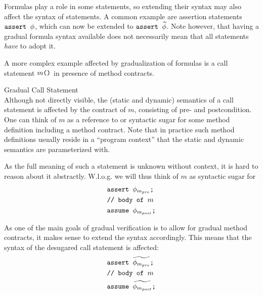 Formulas play a role in some statements, so extending their syntax may also affect the syntax of statements.
A common example are assertion statements $\textup{\texttt{assert $\phi$}}$, which can now be extended to $\textup{\texttt{assert $\widetilde{\phi}$}}$.
Note however, that having a gradual formula syntax available does not necessarily mean that all statements \emph{have} to adopt it.

A more complex example affected by gradualization of formulas is a call statement $\textup{\texttt{$m$()}}$ in presence of method contracts.
\begin{example}{Gradual Call Statement}~\\
    Although not directly visible, the (static and dynamic) semantics of a call statement is affected by the contract of $m$, consisting of pre- and postcondition.
    One can think of $m$ as a reference to or syntactic sugar for some method definition including a method contract.
    Note that in practice such method definitions usually reside in a “program context” that the static and dynamic semantics are parameterized with.
    
    As the full meaning of such a statement is unknown without context, it is hard to reason about it abstractly.
    W.l.o.g. we will thus think of $m$ as syntactic sugar for 
    \begin{align*}
    &\textup{\texttt{assert $\phi_{m_{pre}}$;}}\\
    &\textup{\texttt{// body of $m$}}\\
    &\textup{\texttt{assume $\phi_{m_{post}}$;}}
    \end{align*}
    
    As one of the main goals of gradual verification is to allow for gradual method contracts, it makes sense to extend the syntax accordingly.
    This means that the syntax of the desugared call statement is affected:
    \begin{align*}
    &\textup{\texttt{assert $\widetilde{\phi_{m_{pre}}}$;}}\\
    &\textup{\texttt{// body of $m$}}\\
    &\textup{\texttt{assume $\widetilde{\phi_{m_{post}}}$;}}
    \end{align*}
\end{example}

